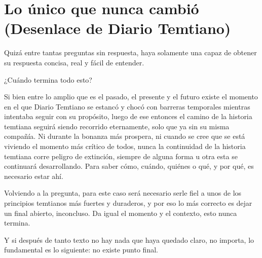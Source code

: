 \documentclass[
  spanish,
]{book}
\begin{document}
\hypertarget{lo-uxfanico-que-nunca-cambiuxf3-desenlace-de-diario-temtiano}{%
\chapter{Lo único que nunca cambió (Desenlace de Diario Temtiano)}\label{lo-uxfanico-que-nunca-cambiuxf3-desenlace-de-diario-temtiano}}

Quizá entre tantas preguntas sin respuesta, haya solamente una capaz de obtener su respuesta concisa, real y fácil de entender.

¿Cuándo termina todo esto?

Si bien entre lo amplio que es el pasado, el presente y el futuro existe el momento en el que Diario Temtiano se estancó y chocó con barreras temporales mientras intentaba seguir con su propósito, luego de ese entonces el camino de la historia temtiana seguirá siendo recorrido eternamente, solo que ya sin su misma compañía. Ni durante la bonanza más prospera, ni cuando se cree que se está viviendo el momento más crítico de todos, nunca la continuidad de la historia temtiana corre peligro de extinción, siempre de alguna forma u otra esta se continuará desarrollando. Para saber cómo, cuándo, quiénes o qué, y por qué, es necesario estar ahí.

Volviendo a la pregunta, para este caso será necesario serle fiel a unos de los principios temtianos más fuertes y duraderos, y por eso lo más correcto es dejar un final abierto, inconcluso. Da igual el momento y el contexto, esto nunca termina.

Y si después de tanto texto no hay nada que haya quedado claro, no importa, lo fundamental es lo siguiente: no existe punto final.
\end{document}
